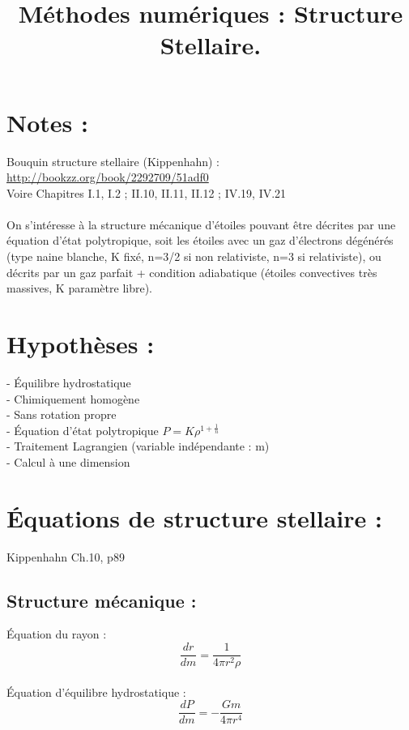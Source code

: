 \documentclass[a4paper,10pt]{article}
\begin{document}
\title{Méthodes numériques : Structure Stellaire.}
\maketitle
\tableofcontents

\section*{Notes :}
Bouquin structure stellaire (Kippenhahn) :\\
\url{http://bookzz.org/book/2292709/51adf0}\\
Voire Chapitres I.1, I.2 ; II.10, II.11, II.12 ; IV.19, IV.21\\
\\
On s'intéresse à la structure mécanique d'étoiles pouvant être décrites par une équation d'état polytropique, soit les étoiles avec un gaz d'électrons dégénérés (type naine blanche, K fixé, n=3/2 si non relativiste, n=3 si relativiste), ou décrits par un gaz parfait + condition adiabatique (étoiles convectives très massives, K paramètre libre).\\


\newpage
\section{Hypothèses :}
- Équilibre hydrostatique\\
- Chimiquement homogène \\
- Sans rotation propre \\
- Équation d'état polytropique $ P = K \rho^{1+\frac{1}{n}} $ \\
- Traitement Lagrangien (variable indépendante : m)\\
- Calcul à une dimension

\section{Équations de structure stellaire :}
Kippenhahn Ch.10, p89
\subsection{Structure mécanique :}
Équation du rayon :
\begin{equation}
\frac{d r}{d m} = \frac{1}{4 \pi r^2 \rho}
\end{equation}
\\
Équation d'équilibre hydrostatique : 
\begin{equation}
\frac{d P}{d m} = - \frac{G m}{4 \pi r^4}
\end{equation}
\end{document}
